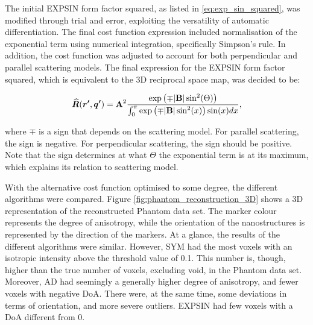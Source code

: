 The initial EXPSIN form factor squared, as listed in \eqref{eq:exp_sin_squared}, was modified through trial and error, exploiting the versatility of automatic differentiation.
The final cost function expression included normalisation of the exponential term using numerical integration, specifically Simpson's rule.
In addition, the cost function was adjusted to account for both perpendicular and parallel scattering models.
The final expression for the EXPSIN form factor squared, which is equivalent to the 3D reciprocal space map, was decided to be:

\begin{equation}
    \label{eq:final_exp_sin_squared}
    \bm{\widehat{R}}(\bm{r'}, \bm{q'}) = \bm{\mathrm{A}}^{2} \frac{\exp\left( \mp |\bm{\mathrm{B}}| \sin^{2}(\mathrm{\boldsymbol{\Theta}}) \right)}{\int_{0}^{\pi} \exp\left( \mp |\bm{\mathrm{B}}| \sin^{2}(x) \right) \sin(x) dx},
\end{equation}

where $\mp$ is a sign that depends on the scattering model. For parallel scattering, the sign is negative. For perpendicular scattering, the sign should be positive.
Note that the sign determines at what $\Theta$ the exponential term is at its maximum, which explains its relation to scattering model.

With the alternative cost function optimised to some degree, the different algorithms were compared.
Figure \ref{fig:phantom_reconstruction_3D} shows a 3D representation of the reconstructed Phantom data set.
The marker colour represents the degree of anisotropy, while the orientation of the nanostructures is represented by the direction of the markers.
At a glance, the results of the different algorithms were similar.
However, SYM had the most voxels with an isotropic intensity above the threshold value of 0.1.
This number is, though, higher than the true number of voxels, excluding void, in the Phantom data set.
Moreover, AD had seemingly a generally higher degree of anisotropy, and fewer voxels with negative DoA.
There were, at the same time, some deviations in terms of orientation, and more severe outliers.
EXPSIN had few voxels with a DoA different from $0$.


